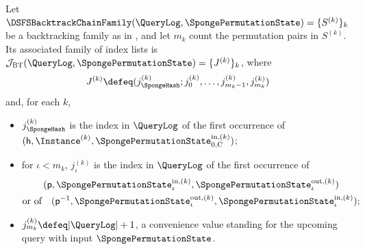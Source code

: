 \begin{definition}
\label{def:dsfs_backtrack_index_list}
\leanok
{}
Let \(\DSFSBacktrackChainFamily(\QueryLog,\SpongePermutationState)=\{S^{(k)}\}_k\) be a backtracking family as in , and let \(m_k\) count the permutation pairs in \(S^{(k)}\). Its associated family of index lists is \(\mathcal J_{\mathrm{BT}}(\QueryLog,\SpongePermutationState)=\{J^{(k)}\}_k\), where
\begin{equation*}
J^{(k)} \defeq (j^{(k)}_{\SpongeHash}; j^{(k)}_0, \dots, j^{(k)}_{m_k-1}, j^{(k)}_{m_k})
\end{equation*}
and, for each \(k\),
\begin{itemize}
\item \(j^{(k)}_{\SpongeHash}\) is the index in \(\QueryLog\) of the first occurrence of \((\mathsf{h}, \Instance^{(k)}, \SpongePermutationState^{\mathrm{in},(k)}_{0,\mathrm C})\);
\item for \(\iota < m_k\), \(j^{(k)}_\iota\) is the index in \(\QueryLog\) of the first occurrence of
  \begin{equation*}
  \begin{gathered}
  (\mathsf{p}, \SpongePermutationState^{\mathrm{in},(k)}_\iota, \SpongePermutationState^{\mathrm{out},(k)}_\iota)\\
  \text{or of}\quad
  (\mathsf{p}^{-1}, \SpongePermutationState^{\mathrm{out},(k)}_\iota, \SpongePermutationState^{\mathrm{in},(k)}_\iota);
  \end{gathered}
  \end{equation*}
\item \(j^{(k)}_{m_k} \defeq |\QueryLog| + 1\), a convenience value standing for the upcoming query with input \(\SpongePermutationState\).
\end{itemize}
\end{definition}

